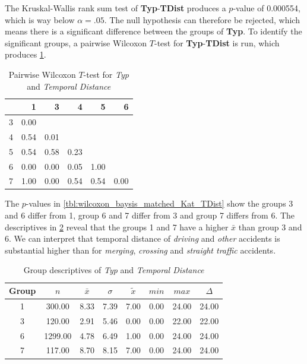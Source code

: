 The Kruskal-Wallis rank sum test of \textbf{Typ}-\textbf{TDist} produces a $p$-value of 0.000554, which is way below $\alpha=.05$. The null hypothesis can therefore be rejected, which means there is a significant difference between the groups of \textbf{Typ}. To identify the significant groups, a pairwise Wilcoxon $T$-test for \textbf{Typ}-\textbf{TDist} is run, which produces \cref{tbl:wilcoxon_baysis_matched_Typ_TDist}. 
\begin{table}[ht]
	\tiny
	\centering
	\begin{tabular}{rrrrrr}
		\toprule
		& 1 & 3 & 4 & 5 & 6 \\ 
		\midrule
		3 & 0.00 &  &  &  &  \\ 
		4 & 0.54 & 0.01 &  &  &  \\ 
		5 & 0.54 & 0.58 & 0.23 &  &  \\ 
		6 & 0.00 & 0.00 & 0.05 & 1.00 &  \\ 
		7 & 1.00 & 0.00 & 0.54 & 0.54 & 0.00 \\ 
		\bottomrule
	\end{tabular}
	\caption{Pairwise Wilcoxon $T$-test for \textit{Typ} and \textit{Temporal Distance}}
	\label{tbl:wilcoxon_baysis_matched_Typ_TDist}
\end{table}
The $p$-values in \cref{tbl:wilcoxon_baysis_matched_Kat_TDist} show the groups 3 and 6 differ from 1, group 6 and 7 differ from 3 and group 7 differs from 6. The descriptives in \cref{tbl:descriptives_baysis_matched_Typ_TDist} reveal that the groups 1 and 7 have a higher $\bar{x}$ than group 3 and 6. We can interpret that temporal distance of \textit{driving} and \textit{other} accidents is substantial higher than for \textit{merging}, \textit{crossing} and \textit{straight traffic} accidents. 
\begin{table}[ht]
	\tiny
	\centering
	\begin{tabular}{c|c|c|c|c|c|c|c}
		\toprule
		Group & $n$ & $\bar{x}$ & $\sigma$ & $\tilde{x}$ & $min$ & $max$ & $\Delta$ \\ 
		\midrule
		1 & 300.00 & 8.33 & 7.39 & 7.00 & 0.00 & 24.00 & 24.00 \\ 
		3 & 120.00 & 2.91 & 5.46 & 0.00 & 0.00 & 22.00 & 22.00 \\ 
		6 & 1299.00 & 4.78 & 6.49 & 1.00 & 0.00 & 24.00 & 24.00 \\ 
		7 & 117.00 & 8.70 & 8.15 & 7.00 & 0.00 & 24.00 & 24.00 \\ 
		\bottomrule
	\end{tabular}
	\caption{Group descriptives of \textit{Typ} and \textit{Temporal Distance}}
	\label{tbl:descriptives_baysis_matched_Typ_TDist}
\end{table}

